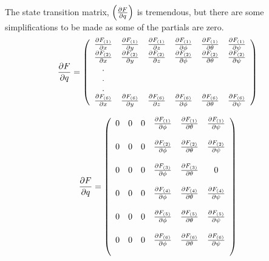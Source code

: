 The state transition matrix, $\left(\frac{\partial F}{\partial q}\right)$  is tremendous, but there are some simplifications to be made as some of the partials are zero.\\

\begin{equation}
    \frac{\partial F}{\partial q} = \left(
    \begin{array}{c c c c c c}
    \frac{\partial F_{(1)}}{\partial x} & \frac{\partial F_{(1)}}{\partial y} & \frac{\partial F_{(1)}}{\partial z} & \frac{\partial F_{(1)}}{\partial \phi} & \frac{\partial F_{(1)}}{\partial \theta} & \frac{\partial F_{(1)}}{\partial \psi}\\

    \frac{\partial F_{(2)}}{\partial x} & \frac{\partial F_{(2)}}{\partial y} & \frac{\partial F_{(2)}}{\partial z} & \frac{\partial F_{(2)}}{\partial \phi} & \frac{\partial F_{(2)}}{\partial \theta} & \frac{\partial F_{(2)}}{\partial \psi}\\

    .\\
    .\\
    .\\

    \frac{\partial F_{(6)}}{\partial x} & \frac{\partial F_{(6)}}{\partial y} & \frac{\partial F_{(6)}}{\partial z} & \frac{\partial F_{(6)}}{\partial \phi} & \frac{\partial F_{(6)}}{\partial \theta} & \frac{\partial F_{(6)}}{\partial \psi}\\

    \end{array}\right)
\end{equation}


\begin{equation}
    \frac{\partial F}{\partial q} = \left(
    \begin{array}{c c c c c c}
    0 & 0 & 0 & \frac{\partial F_{(1)}}{\partial \phi} & \frac{\partial F_{(1)}}{\partial \theta} & \frac{\partial F_{(1)}}{\partial \psi}\\\\

    0 & 0 & 0 & \frac{\partial F_{(2)}}{\partial \phi} & \frac{\partial F_{(2)}}{\partial \theta} & \frac{\partial F_{(2)}}{\partial \psi}\\\\

    0 & 0 & 0 & \frac{\partial F_{(3)}}{\partial \phi} & \frac{\partial F_{(3)}}{\partial \theta} & 0\\\\

    0 & 0 & 0 & \frac{\partial F_{(4)}}{\partial \phi} & \frac{\partial F_{(4)}}{\partial \theta} & \frac{\partial F_{(4)}}{\partial \psi}\\\\

    0 & 0 & 0 & \frac{\partial F_{(5)}}{\partial \phi} & \frac{\partial F_{(5)}}{\partial \theta} & \frac{\partial F_{(5)}}{\partial \psi}\\\\

    0 & 0 & 0 & \frac{\partial F_{(6)}}{\partial \phi} & \frac{\partial F_{(6)}}{\partial \theta} & \frac{\partial F_{(6)}}{\partial \psi}\\\\

    \end{array}\right)
\end{equation}

